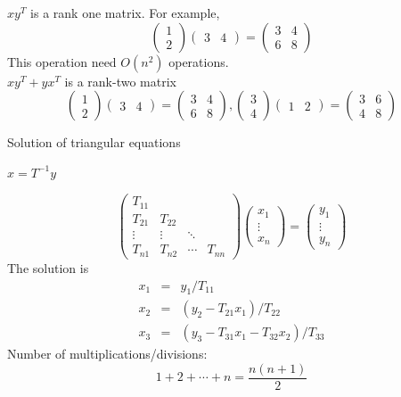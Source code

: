 $x y^T$ is a rank one matrix. For example, 
\[
\begin{pmatrix}
  1 \\ 2 
\end{pmatrix}
\begin{pmatrix} 3 & 4
\end{pmatrix} 
= 
\begin{pmatrix}
  3 & 4 \\ 6 & 8 
\end{pmatrix}
\]
This operation need $O(n^2)$ operations. \\

$xy^T + y x^T$ is a rank-two matrix
\[
\begin{pmatrix}
  1 \\ 2 
\end{pmatrix}
\begin{pmatrix}
3 & 4
\end{pmatrix}
= 
\begin{pmatrix}
  3 & 4 \\ 6 & 8 
\end{pmatrix}
,
\begin{pmatrix}
3 \\ 4  
\end{pmatrix}
\begin{pmatrix}
    1 & 2
\end{pmatrix}
= 
\begin{pmatrix}
3 & 6 \\ 4 & 8  
\end{pmatrix}
\]


\begin{eg}
    Solution of triangular equations
\end{eg}

$x = T^{-1}y $

\[
\begin{pmatrix}
T_{11} &&& \\
T_{21} & T_{22} && \\
\vdots & \vdots & \ddots & \\
T_{n1} & T_{n2} & \cdots & T_{nn}
\end{pmatrix}
\begin{pmatrix}
x_1 \\ \vdots \\ x_n
\end{pmatrix}
=
\begin{pmatrix}
y_1 \\ \vdots \\ y_n
\end{pmatrix}
\]
The solution is 
\begin{eqnarray*}
x_1 & = & y_1 / T_{11} \\
x_2 & = & (y_2 - T_{21} x_1)/T_{22} \\
x_3 & = & (y_3 - T_{31} x_1 - T_{32} x_2)/T_{33}
\end{eqnarray*}
Number of multiplications/divisions:
\[
    1 + 2 + \cdots + n = \frac{n(n+1)}{2}
\]

